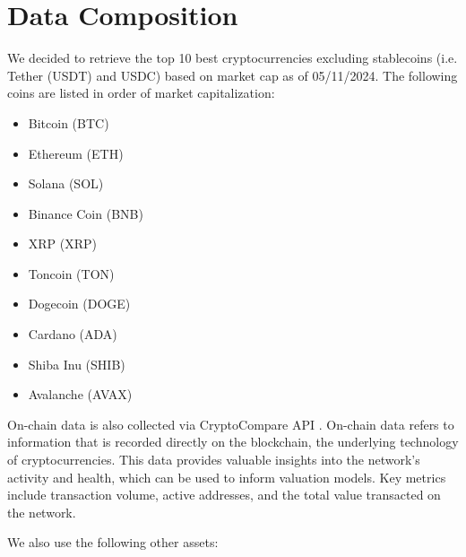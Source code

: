 \section{Data Composition}

We decided to retrieve the top 10 best cryptocurrencies excluding stablecoins (i.e. Tether (USDT) and USDC) based on market cap as of 05/11/2024. The following coins are listed in order of market capitalization: 

\begin{itemize}
    \item Bitcoin (BTC)
    \item Ethereum (ETH)
    \item Solana (SOL)
    \item Binance Coin (BNB)
    \item XRP (XRP)
    \item Toncoin (TON)
    \item Dogecoin (DOGE)
    \item Cardano (ADA)
    \item Shiba Inu (SHIB)
    \item Avalanche (AVAX)
\end{itemize}

On-chain data is also collected via CryptoCompare API \cite{cryptocompare_api}. On-chain data refers to information that is recorded directly on the blockchain, the underlying technology of cryptocurrencies. This data provides valuable insights into the network's activity and health, which can be used to inform valuation models. Key metrics include transaction volume, active addresses, and the total value transacted on the network.

We also use the following other assets:

